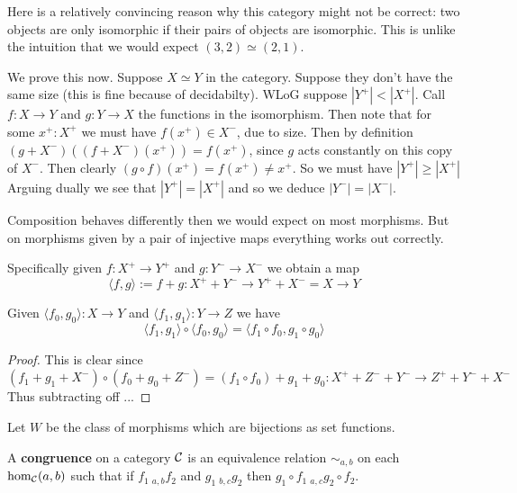 \documentclass{article}
\begin{document}
\begin{remark}
    Here is a relatively convincing reason why this category might not be correct: two objects are only isomorphic if their pairs of objects are isomorphic.
    This is unlike the intuition that we would expect $(3, 2) \simeq (2, 1)$.

    We prove this now. Suppose $X \simeq Y$ in the category. 
    Suppose they don't have the same size (this is fine because of decidabilty).
    WLoG suppose $| Y^+ | < | X^+ |$.
    Call $f : X \to Y$ and $g : Y \to X$ the functions in the isomorphism.
    Then note that for some $x^+ : X^+$ we must have $f(x^+) \in X^-$, due to size.
    Then by definition $(g + X^-)( (f + X^-)(x^+) ) = f(x^+)$, since $g$ acts constantly on this copy of $X^-$. 
    Then clearly $(g \circ f)(x^+) = f(x^+) \neq x^+$. 
    So we must have $| Y^+ | \geq | X^+ |$
    Arguing dually we see that $|Y^+| = |X^+|$ and so we deduce $|Y^-| = |X^-|$.
\end{remark}

Composition behaves differently then we would expect on most morphisms.
But on morphisms given by a pair of injective maps everything works out correctly.

\begin{definition}
    Specifically given $f : X^+ \to Y^+$ and $g : Y^- \to X^-$ we obtain a map
    \[\langle f, g \rangle := f + g : X^+ + Y^- \to Y^+ + X^- = X \to Y \]
\end{definition}

\begin{lemma}
    Given $\langle f_0, g_0 \rangle : X \to Y$ and $\langle f_1, g_1 \rangle : Y \to Z$ we have
    \[\langle f_1, g_1 \rangle \circ \langle f_0, g_0 \rangle  = \langle f_1 \circ f_0, g_1 \circ g_0 \rangle\] 
\end{lemma}
\begin{proof}
    This is clear since $(f_1 +g_1 +X^-) \circ (f_0 + g_0 + Z^-)= (f_1 \circ f_0) + g_1 + g_0 : X^+ + Z^- + Y^- \to Z^+ + Y^- + X^-$
    Thus subtracting off ... \todo{}
\end{proof}

Let $W$ be the class of morphisms which are bijections as set functions.

\begin{definition}
  A \textbf{congruence} on a category $\mathcal{C}$ is an equivalence relation $\sim_{a,b}$ on each $\hom_{\mathcal{C}}(a, b)$ such that if $f_1 ~_{a, b} f_2$ and $g_1 ~_{b, c} g_2$ then $g_1 \circ f_1 ~_{a, c} g_2 \circ f_2$.
\end{definition}
\end{document}

